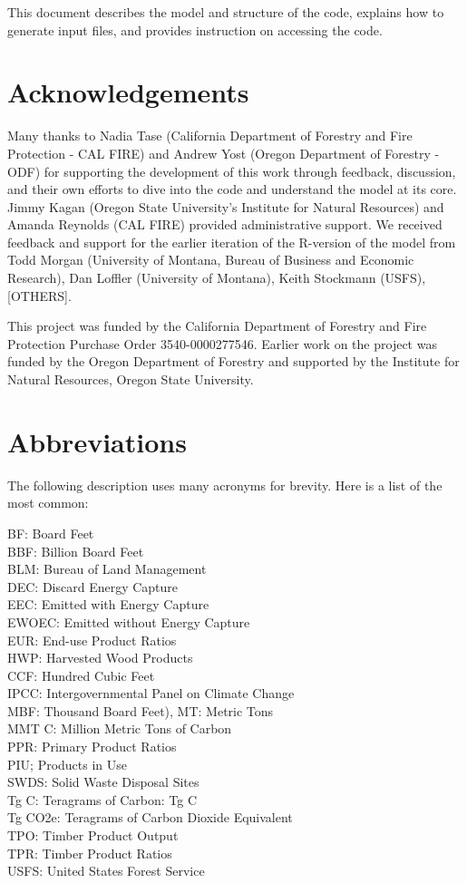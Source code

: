 \documentclass[
  openany]{book}
\begin{document}
This document describes the model and structure of the code, explains how to generate input files, and provides instruction on accessing the code.

\hypertarget{sum-ack}{%
\section{Acknowledgements}\label{sum-ack}}

Many thanks to Nadia Tase (California Department of Forestry and Fire Protection - CAL FIRE) and Andrew Yost (Oregon Department of Forestry - ODF) for supporting the development of this work through feedback, discussion, and their own efforts to dive into the code and understand the model at its core. Jimmy Kagan (Oregon State University's Institute for Natural Resources) and Amanda Reynolds (CAL FIRE) provided administrative support. We received feedback and support for the earlier iteration of the R-version of the model from Todd Morgan (University of Montana, Bureau of Business and Economic Research), Dan Loffler (University of Montana), Keith Stockmann (USFS), {[}OTHERS{]}.

This project was funded by the California Department of Forestry and Fire Protection Purchase Order 3540-0000277546. Earlier work on the project was funded by the Oregon Department of Forestry and supported by the Institute for Natural Resources, Oregon State University.

\hypertarget{sum-abb}{%
\section{Abbreviations}\label{sum-abb}}

The following description uses many acronyms for brevity. Here is a list of the most common:

BF: Board Feet\\
BBF: Billion Board Feet\\
BLM: Bureau of Land Management\\
DEC: Discard Energy Capture\\
EEC: Emitted with Energy Capture\\
EWOEC: Emitted without Energy Capture\\
EUR: End-use Product Ratios\\
HWP: Harvested Wood Products\\
CCF: Hundred Cubic Feet\\
IPCC: Intergovernmental Panel on Climate Change\\
MBF: Thousand Board Feet),
MT: Metric Tons\\
MMT C: Million Metric Tons of Carbon\\
PPR: Primary Product Ratios\\
PIU; Products in Use\\
SWDS: Solid Waste Disposal Sites\\
Tg C: Teragrams of Carbon: Tg C\\
Tg CO2e: Teragrams of Carbon Dioxide Equivalent\\
TPO: Timber Product Output\\
TPR: Timber Product Ratios\\
USFS: United States Forest Service
\end{document}
